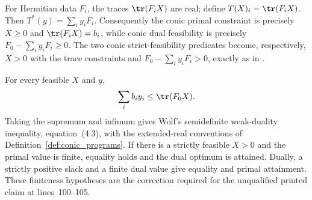 \begin{definition}
    \label{def:semidefinite_trace_analysis}
    \leanok
    For Hermitian data $F_i$, the traces $\tr(F_iX)$ are real; define
    $T(X)_i=\tr(F_iX)$.  Then
    $T^*(y)=\sum_i y_iF_i$.  Consequently the conic primal constraint is
    precisely $X\geq0$ and $\tr(F_iX)=b_i$, while conic dual feasibility is
    precisely $F_0-\sum_i y_iF_i\geq0$.  The two conic strict-feasibility
    predicates become, respectively, $X>0$ with the trace constraints and
    $F_0-\sum_i y_iF_i>0$, exactly as in
    \cite[Chapter~4, lines~85--105]{Wolf2012Quantum}.
\end{definition}

\begin{theorem}
    \label{thm:semidefinite_duality}
    \leanok
    For every feasible $X$ and $y$,
    \begin{align}
        \sum_i b_i y_i\leq\tr(F_0X).
    \end{align}
    Taking the supremum and infimum gives Wolf's semidefinite weak-duality
    inequality, equation~(4.3), with the extended-real conventions of
    Definition~\ref{def:conic_programs}.  If there is a strictly feasible
    $X>0$ and the primal value is finite, equality holds and the dual optimum
    is attained.  Dually, a strictly positive slack and a finite dual value
    give equality and primal attainment.  These finiteness hypotheses are the
    correction required for the unqualified printed claim at lines~100--105.
\end{theorem}

